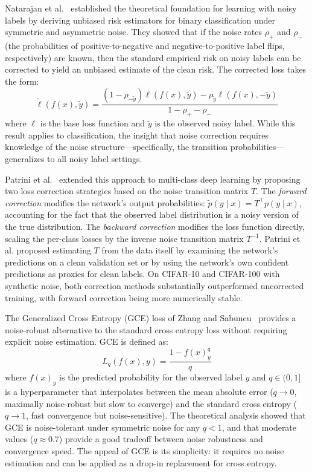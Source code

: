 Natarajan et al.~\cite{natarajan2013learning} established the theoretical foundation for learning with noisy labels by deriving unbiased risk estimators for binary classification under symmetric and asymmetric noise. They showed that if the noise rates $\rho_+$ and $\rho_-$ (the probabilities of positive-to-negative and negative-to-positive label flips, respectively) are known, then the standard empirical risk on noisy labels can be corrected to yield an unbiased estimate of the clean risk. The corrected loss takes the form:
\begin{equation}
\tilde{\ell}(f(x), \tilde{y}) = \frac{(1-\rho_{-\tilde{y}}) \ell(f(x), \tilde{y}) - \rho_{\tilde{y}} \ell(f(x), -\tilde{y})}{1 - \rho_+ - \rho_-}
\end{equation}
where $\ell$ is the base loss function and $\tilde{y}$ is the observed noisy label. While this result applies to classification, the insight that noise correction requires knowledge of the noise structure---specifically, the transition probabilities---generalizes to all noisy label settings.

Patrini et al.~\cite{patrini2017making} extended this approach to multi-class deep learning by proposing two loss correction strategies based on the noise transition matrix $T$. The \emph{forward correction} modifies the network's output probabilities: $\tilde{p}(y \mid x) = T^\top p(y \mid x)$, accounting for the fact that the observed label distribution is a noisy version of the true distribution. The \emph{backward correction} modifies the loss function directly, scaling the per-class losses by the inverse noise transition matrix $T^{-1}$. Patrini et al. proposed estimating $T$ from the data itself by examining the network's predictions on a clean validation set or by using the network's own confident predictions as proxies for clean labels. On CIFAR-10 and CIFAR-100 with synthetic noise, both correction methods substantially outperformed uncorrected training, with forward correction being more numerically stable.

The Generalized Cross Entropy (GCE) loss of Zhang and Sabuncu~\cite{zhang2018generalized} provides a noise-robust alternative to the standard cross entropy loss without requiring explicit noise estimation. GCE is defined as:
\begin{equation}
L_q(f(x), y) = \frac{1 - f(x)_y^q}{q}
\end{equation}
where $f(x)_y$ is the predicted probability for the observed label $y$ and $q \in (0,1]$ is a hyperparameter that interpolates between the mean absolute error ($q \to 0$, maximally noise-robust but slow to converge) and the standard cross entropy ($q \to 1$, fast convergence but noise-sensitive). The theoretical analysis showed that GCE is noise-tolerant under symmetric noise for any $q < 1$, and that moderate values ($q \approx 0.7$) provide a good tradeoff between noise robustness and convergence speed. The appeal of GCE is its simplicity: it requires no noise estimation and can be applied as a drop-in replacement for cross entropy.

